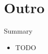 \section*{Outro}

\begin{frame}{Summary}
  \begin{itemize}
  \item TODO
  \end{itemize}
\end{frame}


